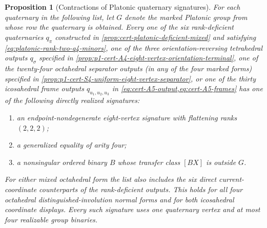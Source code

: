 \documentclass[11pt,letterpaper,onecolumn]{article}
\theoremstyle{plain}
\newtheorem{proposition}[proposition]{Proposition}
\theoremstyle{definition}
\theoremstyle{remark}
\begin{document}
\begin{proposition}[Contractions of Platonic quaternary signatures]
\label{prop:cert-platonic-q4-exits}
For each quaternary in the following list, let \(G\) denote the marked
Platonic group from whose row the quaternary is obtained.  Every one of the
six rank-deficient quaternaries \(q_\pi\) constructed in
\cref{prop:cert-platonic-deficient-mixed} and satisfying
\cref{eq:platonic-rank-two-q4-minors}, one of the three
orientation-reversing tetrahedral outputs \(q_\sigma\) specified in
\cref{prop:p1-cert-A4-eight-vertex-orientation-terminal}, one of the twenty-four
octahedral separator outputs (in any of the four marked forms) specified in
\cref{prop:p1-cert-S4-uniform-eight-vertex-separator}, or one of the thirty
icosahedral frame outputs \(q_{u_1,u_2,u_3}\) in
\cref{eq:cert-A5-output,eq:cert-A5-frames} has one of the
following directly realized signatures:
\begin{enumerate}
\item an endpoint-nondegenerate eight-vertex signature with flattening ranks
      \((2,2,2)\);
\item a generalized equality of arity four;
\item a nonsingular ordered binary \(B\) whose transfer class \([BX]\) is
      outside \(G\).
\end{enumerate}
For either mixed octahedral form the list also includes the six direct
current-coordinate counterparts of the rank-deficient outputs.  This holds for
all four octahedral distinguished-involution normal forms and for both
icosahedral coordinate displays.  Every such signature uses one
quaternary vertex and at most four realizable group binaries.
\end{proposition}
\end{document}
